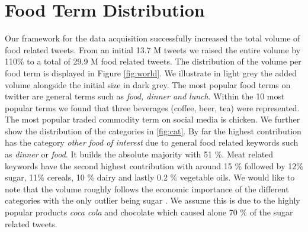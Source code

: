 \section {Food Term Distribution}

Our framework for the data acquisition successfully increased the total volume of food related tweets. From an initial 13.7 M tweets we raised the entire volume by 110\% to a total of 29.9 M food related tweets. The distribution of the volume per food term is displayed in Figure \ref{fig:world}. We illustrate in light grey the added volume alongside the initial size in dark grey. The most popular food terms on twitter are general terms such as \emph{food, dinner and lunch}. Within the 10 most popular terms we found that three beverages (coffee, beer, tea) were represented. The most popular traded commodity term on social media is chicken.  We further show the distribution of the categories in \ref{fig:cat}. By far the highest contribution has the category \emph{other food of interest} due to general food related keywords such as \emph{dinner} or \emph{food}. It builds the absolute majority with 51 \%. Meat related keywords have the second highest contribution with around 15 \% followed by 12\% sugar, 11\%  cereals, 10 \% dairy  and lastly 0.2 \% vegetable oils. We would like to note that the volume roughly follows the economic importance of the different categories with the only outlier being sugar \cite{fao2008}. We assume this is due to the highly popular products \emph{coca cola} and {chocolate} which caused alone 70 \% of the sugar related tweets. 



